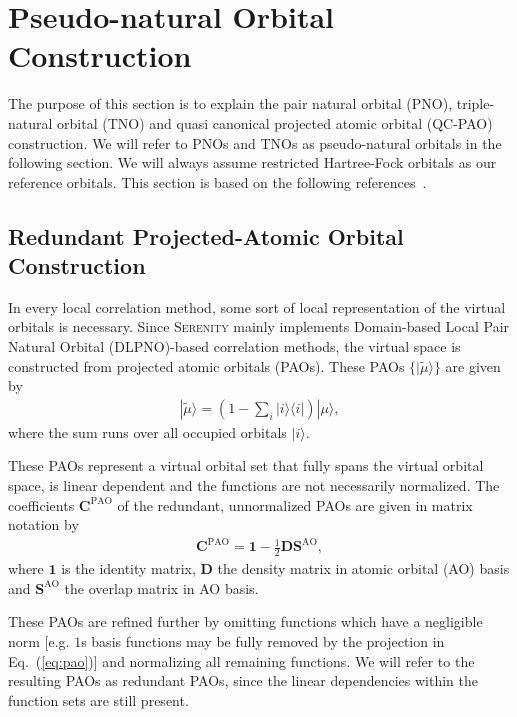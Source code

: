 \section{Pseudo-natural Orbital Construction}
The purpose of this section is to explain the pair natural orbital (PNO), triple-natural orbital (TNO) and
quasi canonical projected atomic orbital (QC-PAO) construction. We will refer to PNOs and TNOs as pseudo-natural
orbitals in the following section. We will always assume restricted Hartree-Fock orbitals as our reference orbitals.
This section is based on the following references~\cite{Pulay1983,Neese2009b,Riplinger2013a}.

\subsection{Redundant Projected-Atomic Orbital Construction}
In every local correlation method, some sort of local representation of the virtual orbitals is necessary.
Since \textsc{Serenity} mainly implements Domain-based Local Pair Natural Orbital (DLPNO)-based correlation
methods, the virtual space is constructed from projected atomic orbitals (PAOs).
These PAOs $\{|\tilde{\mu}\rangle\}$ are given by
\begin{align}
  |\tilde{\mu}\rangle = \left(1-\sum_{i} |i\rangle\langle i|\right)|\mu\rangle,
  \label{eq:pao}
\end{align}
where the sum runs over all occupied orbitals $|i\rangle$.

These PAOs represent a virtual orbital set that fully spans the virtual orbital space, is linear dependent
and the functions are not necessarily normalized.
The coefficients $\pmb{C}^{\mathrm{PAO}}$ of the redundant, unnormalized PAOs are given in matrix
notation by
\begin{align}
  \pmb{C}^{\mathrm{PAO}} = \pmb{1}-\frac{1}{2} \pmb{D}\pmb{S}^\mathrm{AO},
\end{align}
where $\pmb{1}$ is the identity matrix, $\pmb{D}$ the density matrix in atomic orbital (AO) basis and
$\pmb{S}^\mathrm{AO}$ the overlap matrix in AO basis.

These PAOs are refined further by omitting functions which have a negligible norm
[e.g. $1$s basis functions may be fully removed by the projection in Eq.~(\ref{eq:pao})]
and normalizing all remaining functions.
We will refer to the resulting PAOs as redundant PAOs, since the linear dependencies within the function
sets are still present.

